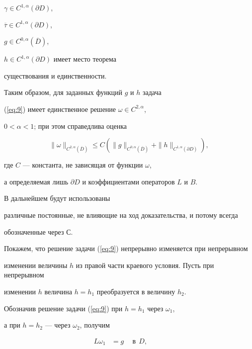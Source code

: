 \begin{pf}
$\gamma \in C^{1,\alpha } ({\partial D})$,


$\overline \tau \in C^{1,\alpha } ({\partial D})$,


$g \in C^{0,\alpha } ({\overline D })$,


$h \in C^{1,\alpha } ({\partial D})$ имеет место теорема


существования и единственности.


Таким образом, для заданных функций $g$ и $h$ задача


(\ref{eq:9}) имеет единственное решение $\omega \in C^{2,\alpha }$, 


$0 < \alpha < 1$; при этом справедлива оценка


\begin{equation}\label{eq:10}


\| \omega \|_{C^{2,\alpha } ({\overline D })} \le 


C ({ \| g \|_{C^{0,\alpha } ({\overline D })}+


\| h \|_{C^{1,\alpha } ({\partial D})} }),


\end{equation}


где $C$ --- константа, не зависящая от функции $\omega$, 


а определяемая лишь $\partial D$ и коэффициентами операторов $L$ и $B$. 


В дальнейшем будут использованы 


различные постоянные, не влияющие на ход доказательства, и потому всегда 


обозначенные через $С$.





Покажем, что решение задачи (\ref{eq:9}) непрерывно изменяется при непрерывном


изменении величины $h$ из правой части краевого условия. Пусть при непрерывном


изменении $h$ величина $h=h_1$ преобразуется в величину $h_2$. 


Обозначив решение задачи (\ref{eq:9}) при $h=h_1$ через $\omega_1$,


а при $h=h_2$ --- через $\omega_2$, получим


\begin{equation}\label{eq:11}


\begin{split}


L\omega_1 &= g \quad \ \text{в} \ \ D, \qquad \ \ 



\end{split}
\end{equation}
\end{pf}

